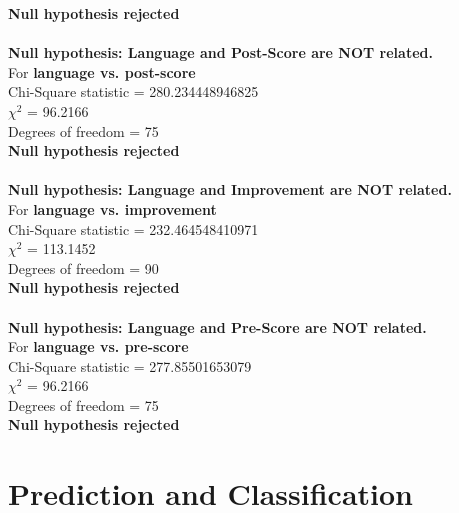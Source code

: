 \documentclass[10pt]{article}
\begin{document}
 \textbf{Null hypothesis rejected}\\
\\
\textbf{Null hypothesis: Language and Post-Score are NOT related.}\\
 For \textbf{language vs. post-score}\\
 Chi-Square statistic = 280.234448946825\\
 ${\chi}^2$ = 96.2166\\
 Degrees of freedom = 75\\
 \textbf{Null hypothesis rejected}\\
\\
\textbf{Null hypothesis: Language and Improvement are NOT related.}\\
 For \textbf{language vs. improvement}\\
 Chi-Square statistic = 232.464548410971\\
 ${\chi}^2$ = 113.1452\\
 Degrees of freedom = 90\\
 \textbf{Null hypothesis rejected}\\
\\
\textbf{Null hypothesis: Language and Pre-Score are NOT related.}\\
 For \textbf{language vs. pre-score}\\
 Chi-Square statistic = 277.85501653079\\
 ${\chi}^2$ = 96.2166\\
 Degrees of freedom = 75\\
 \textbf{Null hypothesis rejected}\\

\newpage
\section{Prediction and Classification}
\end{document}
